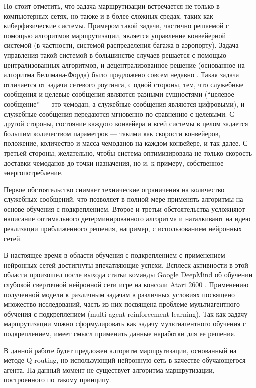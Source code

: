 \documentclass[specification, annotation]{itmo-student-thesis}
\begin{document}
Но стоит отметить, что задача маршрутизации встречается не только в компьютерных сетях, но
также и в более сложных средах, таких как киберфизические системы. Примером такой
задачи, частично решаемой с помощью алгоритмов маршрутизации, является
управление конвейерной системой (в частности, системой распределения багажа в
аэропорту). Задача управления такой системой в большинстве случаев решается с
помощью централизованных алгоритмов, и децентрализованное решение (основанное на
алгоритма Беллмана-Форда) было предложено совсем недавно \cite{vyatkin-controllers}. 
Такая задача отличается от задачи сетевого роутинга, с одной
стороны, тем, что служебные сообщения и целевые сообщения являются разными
сущностями (\enquote{целевое сообщение} --- это чемодан, а служебные сообщения являются
цифровыми), и служебные сообщения передаются мгновенно по сравнению с целевыми.
С другой стороны, состояние каждого конвейера и всей системы в целом задается
большим количеством параметров --- такими как скорости конвейеров, положение,
количество и масса чемоданов на каждом конвейере, и так далее. С третьей
стороны, желательно, чтобы система оптимизировала не только скорость доставки
чемоданов до точки назначения, но и, к примеру, собственное энергопотребление.

Первое обстоятельство снимает технические ограничения на количество служебных
сообщений, что позволяет в полной мере применять алгоритмы на основе обучения с
подкреплением. Второе и третьи обстоятельства усложняют написание оптимального
детерминированного алгоритма и наталкивают на идею реализации приближенного
решения, например, с использованием нейронных сетей.

В настоящее время в области обучения с подкреплением с применением нейронных
сетей достигнуты впечатляющие успехи. Всплеск активности в этой области
произошел после выхода статьи команды Google DeepMind об обучении глубокой
сверточной нейронной сети игре на консоли Atari 2600 \cite{deepmind-dqn-orig}.
Применению полученной модели к различным задачам в различных условиях посвящено
множество исследований, часть из них посвящена проблеме мультиагентного обучения
с подкреплением (multi-agent reinforcement learning). Так как задачу
маршрутизации можно сформулировать как задачу мультиагентного обучения с
подкреплением, имеет смысл применить данные наработки для ее решения.

В данной работе будет предложен алгоритм маршрутизации, основанный на методе
Q-routing, но использующий нейронную сеть в качестве обучающегося агента.
На данный момент не существует алгоритма маршрутизации, построенного по такому
принципу.
\end{document}
